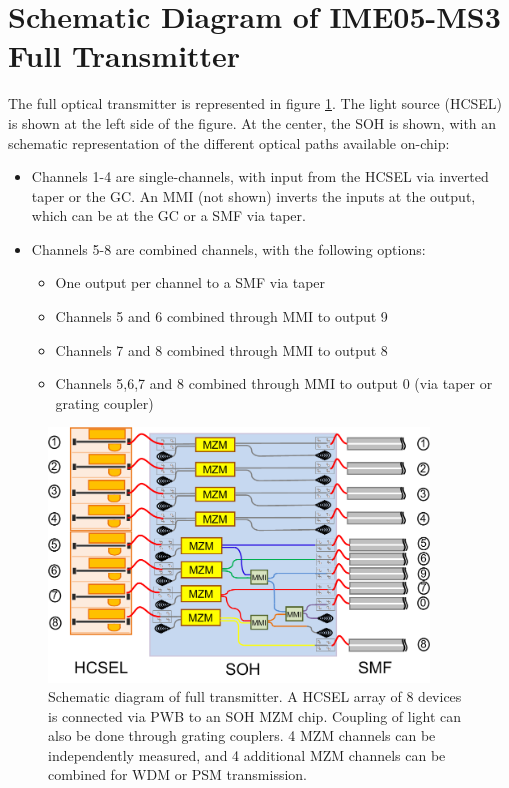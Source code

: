 \section{Schematic Diagram of IME05-MS3 Full Transmitter}

The full optical transmitter is represented in figure \ref{fig:fulltx}. The light source (HCSEL) is shown at the left side of the figure. At the center, the SOH is shown, with an schematic representation of the different optical paths available on-chip: 
\begin{itemize}
\item Channels 1-4 are single-channels, with input from the HCSEL via inverted taper or the GC. An MMI (not shown) inverts the inputs at the output, which can be at the GC or a SMF via taper.
\item Channels 5-8 are combined channels, with the following options:
	\begin{itemize}
		\item One output per channel to a SMF via taper
		\item Channels 5 and 6 combined through MMI to output 9
		\item Channels 7 and 8 combined through MMI to output 8
		\item Channels 5,6,7 and 8 combined through MMI to output 0 (via taper or grating coupler)
	\end{itemize}
\end{itemize}

\begin{figure}[!ht]
\centering
  \includegraphics[width=0.9\textwidth]{visio/Schematic}
  \caption{Schematic diagram of full transmitter. A HCSEL array of 8 devices is connected via PWB to an SOH MZM chip. Coupling of light can also be done through grating couplers. 4 MZM channels can be independently measured, and 4 additional MZM channels can be combined for WDM or PSM transmission.}
  \label{fig:fulltx}
\end{figure}

